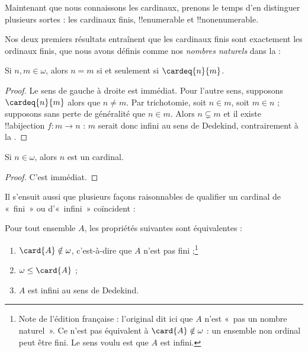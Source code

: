 \documentclass[../../../include/open-logic-section]{subfiles}
\begin{document}

Maintenant que nous connaissons les cardinaux, prenons
le temps d'en distinguer plusieurs sortes : les
cardinaux finis, !!{enumerable} et !!{nonenumerable}.

Nos deux premiers résultats entraînent que les
cardinaux finis sont exactement les ordinaux
finis, que nous avons définis comme nos
\emph{nombres naturels} dans la
 :

\begin{prop}
Si $n, m \in \omega$, alors $n = m$ si et
seulement si $\cardeq{n}{m}$.
\end{prop}

\begin{proof}
Le sens de gauche à droite est immédiat.
Pour l'autre sens, supposons
$\cardeq{n}{m}$ alors que $n \neq m$.
Par trichotomie, soit $n \in m$, soit
$m \in n$ ; supposons sans perte de
généralité que $n \in m$. Alors
$n \subsetneq m$ et il existe
!!a{bijection} $f \colon m \to n$ :
$m$ serait donc infini au sens de Dedekind,
contrairement à la
.
\end{proof}

\begin{cor}
Si $n \in \omega$, alors $n$ est un cardinal.
\end{cor}

\begin{proof}
C'est immédiat.
\end{proof}
\noindent
Il s'ensuit aussi que plusieurs façons raisonnables
de qualifier un cardinal de «~fini~» ou d'«~infini~»
coïncident :
\begin{thm}
Pour tout ensemble $A$, les propriétés suivantes
sont équivalentes :
\begin{enumerate}
	\item{}
	$\card{A} \notin \omega$, c'est-à-dire que
	$A$ n'est pas fini ;\footnote{Note de l'édition
	française : l'original dit ici que $A$ n'est
	«~pas un nombre naturel~». Ce n'est pas
	équivalent à $\card{A}\notin\omega$ :
	un ensemble non ordinal peut être fini.
	Le sens voulu est que $A$ est infini.}
	\item{}
	$\omega \leq \card{A}$ ;
	\item{}
	$A$ est infini au sens de Dedekind.
\end{enumerate}
\end{thm}
\end{document}
